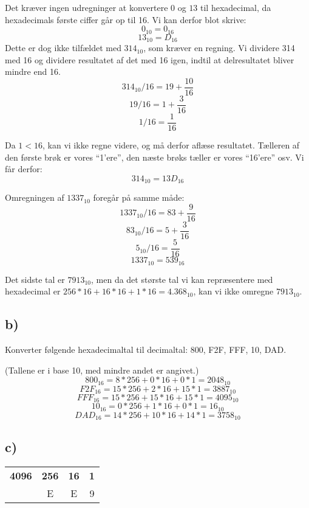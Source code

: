 \documentclass[a4paper,11pt]{article}
\begin{document}
Det kræver ingen udregninger at konvertere $0$ og $13$ til hexadecimal, da hexadecimals første ciffer går op til 16. Vi kan derfor blot skrive: 
$$0_{10} = 0_{16}$$
$$13_{10} = D_{16}$$
Dette er dog ikke tilfældet med $314_{10}$, som kræver en regning. Vi dividere 314 med 16 og dividere resultatet af det med 16 igen, indtil at delresultatet bliver mindre end 16.
$$314_{10}/16 = 19 + \frac{10}{16}$$
$$19/16 = 1 + \frac{3}{16}$$
$$1/16 = \frac{1}{16}$$

Da $1 < 16$, kan vi ikke regne videre, og må derfor aflæse resultatet. Tælleren af den første brøk er vores ``1'ere'', den næste brøks tæller er vores ``16'ere'' osv. Vi får derfor:
$$314_{10} = 13D_{16}$$

Omregningen af $1337_{10}$ foregår på samme måde:
$$1337_{10}/16 = 83 + \frac{9}{16}$$
$$83_{10}/16 = 5 + \frac{3}{16}$$
$$5_{10}/16 = \frac{5}{16}$$
$$1337_{10} = 539_{16}$$

Det sidste tal er $7913_{10}$, men da det største tal vi kan repræsentere med hexadecimal er $256*16+16*16+1*16 = 4.368_{10}$, kan vi ikke omregne $7913_{10}$.

\subsection*{b)}
\tb{}

Konverter følgende hexadecimaltal til decimaltal: 800, F2F, FFF, 10, DAD. 

(Tallene er i base 10, med mindre andet er angivet.)
$$ 800_{16} = 8*256 + 0 * 16 + 0 * 1 = 2048_{10}$$
$$ F2F_{16} = 15 * 256 + 2 * 16 + 15 * 1 = 3887_{10}$$
$$ FFF_{16} = 15 * 256 + 15 * 16 + 15 * 1 = 4095_{10}$$
$$ 10_{16} = 0* 256 + 1 * 16 + 0 * 1 = 16_{10}$$
$$ DAD_{16} = 14 * 256 + 10 * 16 + 14 * 1 = 3758_{10}$$

\subsection*{c)}
\tb{}

\begin{center}
  \begin{tabular}{| c | c | c | c |}
    \hline
     \textbf{4096} & \textbf{256} & \textbf{16} & \textbf{1}\\ \hline
    1 & E & E & 9\\
    \hline
  \end{tabular}
\end{center}
\end{document}
